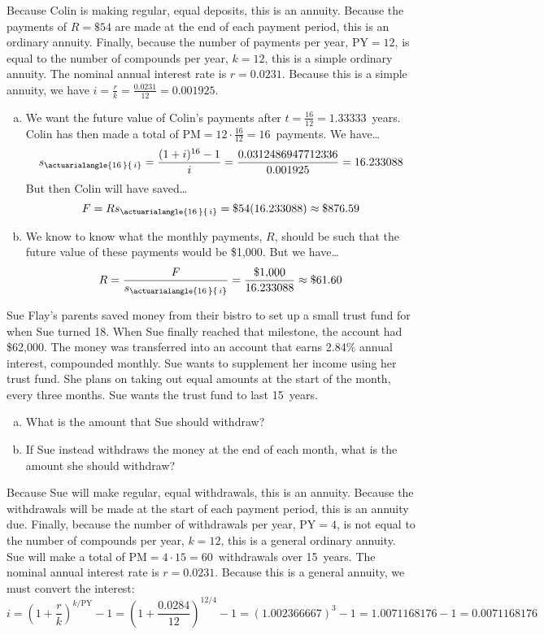 \documentclass[11pt,letterpaper]{article}
\newcommand{\actS}[2]{s_{\actuarialangle{#1\,}{\,#2}}} %
\begin{document}
\sol Because Colin is making regular, equal deposits, this is an annuity. Because the payments of $R= \$54$ are made at the end of each payment period, this is an ordinary annuity. Finally, because the number of payments per year, $\text{PY}= 12$, is equal to the number of compounds per year, $k= 12$, this is a simple ordinary annuity. The nominal annual interest rate is $r= 0.0231$. Because this is a simple annuity, we have $i= \frac{r}{k}= \frac{0.0231}{12}= 0.001925$. 

\begin{enumerate}[(a)]
\item We want the future value of Colin's payments after $t= \frac{16}{12}= 1.33333$~years. Colin has then made a total of $\text{PM}= 12 \cdot \frac{16}{12}= 16$~payments. We have\dots
	\[
	\actS{16}{i}= \dfrac{(1 + i)^{16} - 1}{i}= \dfrac{0.0312486947712336}{0.001925}= 16.233088
	\]
But then Colin will have saved\dots
	\[
	F= R \actS{16}{i}= \$54(16.233088) \approx \$876.59
	\] \pspace

\item We know to know what the monthly payments, $R$, should be such that the future value of these payments would be \$1,000. But we have\dots
	\[
	R= \dfrac{F}{\actS{16}{i}}= \dfrac{\$1,\!000}{16.233088} \approx \$61.60
	\]
\end{enumerate}



\newpage



 Sue Flay's parents saved money from their bistro to set up a small trust fund for when Sue turned 18. When Sue finally reached that milestone, the account had \$62,000. The money was transferred into an account that earns 2.84\% annual interest, compounded monthly. Sue wants to supplement her income using her trust fund. She plans on taking out equal amounts at the start of the month, every three months. Sue wants the trust fund to last 15~years. 
	\begin{enumerate}[(a)]
	\item  What is the amount that Sue should withdraw?
	\item If Sue instead withdraws the money at the end of each month, what is the amount she should withdraw? 
	\end{enumerate} \pspace

\sol Because Sue will make regular, equal withdrawals, this is an annuity. Because the withdrawals will be made at the start of each payment period, this is an annuity due. Finally, because the number of withdrawals per year, $\text{PY}= 4$, is not equal to the number of compounds per year, $k= 12$, this is a general ordinary annuity. Sue will make a total of $\text{PM}= 4 \cdot 15= 60$~withdrawals over 15~years. The nominal annual interest rate is $r= 0.0231$. Because this is a general annuity, we must convert the interest:
	\[
	i= \left(1 + \dfrac{r}{k} \right)^{k/\text{PY}} - 1= \left(1 + \dfrac{0.0284}{12} \right)^{12/4} - 1= (1.002366667)^3 - 1= 1.0071168176 - 1= 0.0071168176 
	\]
\end{document}
